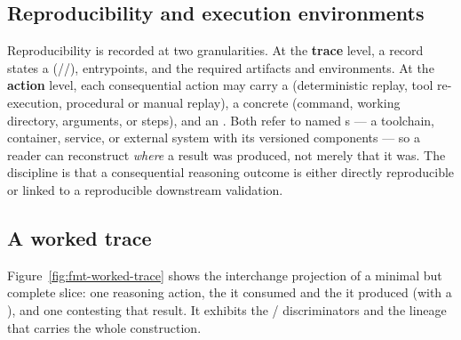 \subsection{Reproducibility and execution environments}\label{sec:format-repro}

Reproducibility is recorded at two granularities. At the \textbf{trace} level, a
 record states a 
(//), entrypoints, and the required artifacts
and environments. At the \textbf{action} level, each consequential action may carry a
 (deterministic replay, tool re-execution, procedural or manual replay), a
concrete  (command, working directory, arguments, or steps), and an
. Both refer to named s --- a toolchain,
container, service, or external system with its versioned components --- so a reader can reconstruct
\emph{where} a result was produced, not merely that it was. The discipline is that a consequential
reasoning outcome is either directly reproducible or linked to a reproducible downstream validation.

\subsection{A worked trace}\label{sec:format-example}

Figure~\ref{fig:fmt-worked-trace} shows the interchange projection of a minimal but complete slice: one reasoning
action, the  it consumed and the  it produced (with a
), and one  contesting that result. It exhibits the
/ discriminators and the  lineage that
carries the whole construction.

